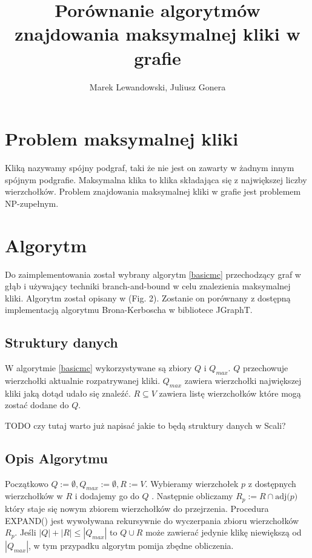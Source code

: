 \documentclass[12pt, a4paper]{article}
\author{Marek Lewandowski, Juliusz Gonera}
\date{}
\title{Porównanie algorytmów znajdowania maksymalnej kliki w grafie}
\begin{document}
\maketitle

\section{Problem maksymalnej kliki}
\label{sec-1}
Kliką nazywamy spójny podgraf, taki że nie jest on zawarty w żadnym innym spójnym podgrafie. Maksymalna klika to klika składająca się z największej liczby wierzchołków. Problem znajdowania maksymalnej kliki w grafie jest problemem NP-zupełnym.

\section{Algorytm}
\label{sec-2}
Do zaimplementowania został wybrany algorytm \ref{basicmc} przechodzący graf w głąb i używający techniki branch-and-bound w celu znalezienia maksymalnej kliki. Algorytm został opisany w \citep{bioinf} (Fig. 2). Zostanie on porównany z dostępną implementacją algorytmu Brona-Kerboscha w bibliotece JGraphT\citep{jgrapht}.

\subsection{Struktury danych}

W algorytmie \ref{basicmc} wykorzystywane są zbiory $Q$ i $Q_{max}$. $Q$ przechowuje wierzchołki aktualnie rozpatrywanej kliki. $Q_{max}$ zawiera wierzchołki największej kliki jaką dotąd udało się znaleźć. $R \subseteq V $ zawiera listę wierzchołków które mogą zostać dodane do $Q$.

TODO czy tutaj warto już napisać jakie to będą struktury danych w Scali?

\subsection{Opis Algorytmu}

Początkowo $Q := \emptyset, Q_{max} := \emptyset, R := V$. Wybieramy wierzchołek $p$ z dostępnych wierzchołków w $R$ i dodajemy go do $Q$ . Następnie obliczamy $R_{p} := R \cap \text{adj(}p\text{)}$ który staje się nowym zbiorem wierzchołków do przejrzenia. Procedura EXPAND() jest wywoływana rekursywnie do wyczerpania zbioru wierzchołków $R_{p}$. Jeśli $|Q|+|R| \leq |Q_{max}|$ to $Q \cup R$ może zawierać jedynie klikę niewiększą od $|Q_{max}|$, w tym przypadku algorytm pomija zbędne obliczenia.
\end{document}
